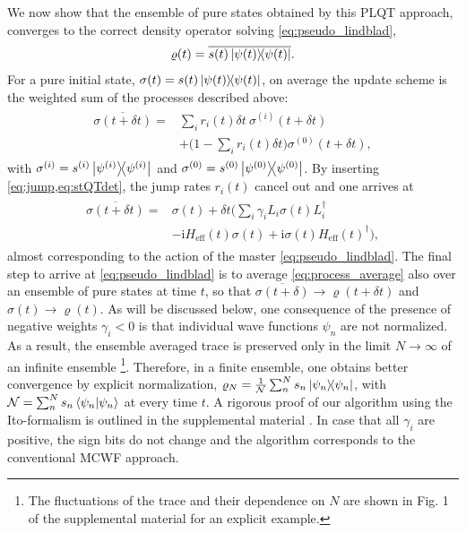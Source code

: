 \documentclass[twocolumn,prl,superscriptaddress]{revtex4-2}
\renewcommand{\i}{\mathrm i}
\begin{document}
We now show that the ensemble of pure states obtained by this PLQT approach, converges to the correct density operator solving \cref{eq:pseudo_lindblad},
\begin{align}
	\varrho(t) = \overline{s(t) \dyad{\psi(t)}}.
\end{align}
For a pure initial state, $\sigma(t) = s(t) \dyad{\psi(t)}$, on average the update scheme is the weighted sum of the processes described above:
\begin{align}
	\begin{aligned}
		\overline{ \sigma (t+  \delta t)} =& \sum_i r_i(t) \delta t\  \sigma^{(i)}(t +\delta t) \\ &+ \bigg(1-\sum_i r_i(t) \delta t\bigg)  \sigma^{(0)}(t +\delta t),
	\end{aligned}
\end{align}
with $\sigma^{(i)} = s^{(i)} \dyad{\psi^{(i)}}$ and $\sigma^{(0)} = s^{(0)} \dyad{\psi^{(0)}}$. By inserting \cref{eq:jump,eq:stQTdet}, the jump rates $r_i(t)$ cancel out and one arrives at 
\begin{align}
	\begin{split}
		\overline{ \sigma (t+  \delta t)} =& \sigma(t) + \delta t \bigg( \sum_i \gamma_i L_i \sigma(t) L_i^\dagger \\ & - \i H_\mathrm{eff}(t) \sigma(t) + \i \sigma(t) H_\mathrm{eff}(t)^\dagger \bigg),
	\end{split}
	\label{eq:process_average}
\end{align}
almost corresponding to the action of the master \cref{eq:pseudo_lindblad}. 
The final step to arrive at \cref{eq:pseudo_lindblad} is to average \cref{eq:process_average} also over an ensemble of pure states at time $t$, so that $\overline{\sigma(t+\delta)}\to\varrho(t+\delta t)$ and $\sigma(t)\to\varrho(t)$.
As will be discussed below, one consequence of the presence of negative weights $\gamma_i<0$ is that individual wave functions $\psi_n$ are not normalized. As a result, the ensemble averaged trace is preserved only in the limit $N\to\infty$ of an infinite ensemble \footnote{The fluctuations of the trace and their dependence on $N$ are shown in Fig. 1 of the supplemental material \cite{supp_TBeckerCNetzerAEckardt2023} for an explicit example.}.
Therefore, in a finite ensemble, one obtains better convergence by explicit normalization, $\varrho_N = \frac{1}{\mathcal{N}}  \sum_n^N s_n \dyad{\psi_n}$, with $\mathcal{N} = \sum_n^N s_n \braket{\psi_n}{\psi_n}$ at every time $t$.
A rigorous proof of our algorithm using the Ito-formalism is outlined in the supplemental material \cite{supp_TBeckerCNetzerAEckardt2023}. In case that all $\gamma_i$ are positive, the sign bits do not change and the algorithm corresponds to the conventional MCWF approach. 
\end{document}
